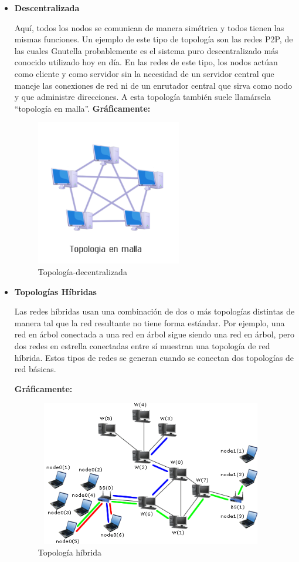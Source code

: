 \begin{itemize}
\item \textbf{Descentralizada}

Aquí, todos los nodos se comunican de manera simétrica y todos tienen las mismas funciones. Un ejemplo de este tipo de topología son las redes P2P, de las cuales Gnutella probablemente es el sistema puro descentralizado más conocido utilizado hoy en día. En las redes de este tipo, los nodos actúan como cliente y como servidor sin la necesidad de un servidor central que maneje las conexiones de red ni de un enrutador central que sirva como nodo y que administre direcciones. A esta topología también suele llamársela ``topología en malla''.
\newpage
\textbf{Gráficamente: }

\begin{figure}[H]
\begin{center}
  \includegraphics[height=2.5in,width=2.5in]{images/mesh.png}
\caption{Topología-decentralizada}
\label{fig:Decentralizado}
\end{center}
\end{figure} 

\item \textbf{Topologías Híbridas}

Las redes híbridas usan una combinación de dos o más topologías distintas de manera tal que la red resultante no tiene forma estándar. 
Por ejemplo, una red en árbol conectada a una red en árbol sigue siendo una red en árbol, pero dos redes en estrella conectadas entre sí  
muestran una topología de red híbrida. Estos tipos de redes se generan cuando se conectan dos topologías de red básicas. 

\textbf{Gráficamente: }

\begin{figure}[H]
\begin{center}
  \includegraphics[height=2.5in,width=4.0in]{images/hibrida.png}
\caption{Topología híbrida}
\label{fig:Hibrida}
\end{center}
\end{figure} 


\end{itemize}
